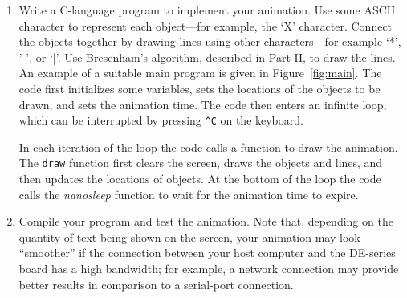 \documentclass[epsfig,10pt,fullpage]{article}
\begin{document}
\begin{enumerate}

\item Write a C-language program to implement your animation. Use some ASCII character to 
represent each object---for example, the `X' character. Connect the objects together by
drawing lines using other characters---for example `*', '-', or `|'. Use Bresenham's
algorithm, described in Part II, to draw the lines. An example of a suitable main program is 
given in Figure~\ref{fig:main}. The code first initializes some variables, sets the
locations of the objects to be drawn, and sets the animation time. The code then enters an
infinite loop, which can be interrupted by pressing \texttt{\^{ }C} on the keyboard. 

In each iteration of the loop the code calls a function to draw the animation. The
\texttt{draw} function first clears the screen, draws the objects and lines, and then updates 
the locations of objects. At the bottom of the loop the code calls the {\it nanosleep} function
to wait for the animation time to expire.

\item Compile your program and test the animation. Note that, depending on the quantity of
text being shown on the screen, your animation may look ``smoother'' if the connection between 
your host computer and the DE-series board has a high bandwidth; for example, a network 
connection may provide better results in comparison to a serial-port connection.
\end{enumerate}
\end{document}

